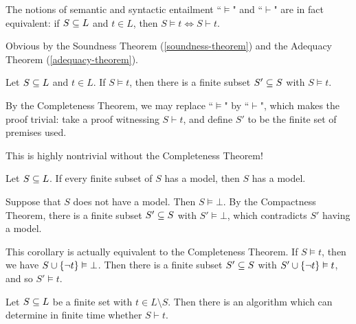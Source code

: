 \documentclass{article}
\begin{document}
\begin{theorem}
	\label{completeness-theorem}
    The notions of semantic and syntactic entailment ``$\vDash$" and ``$\vdash$" are in fact equivalent: if $S \subseteq L$ and $t \in L$, then $S \vDash t \iff S \vdash t$.
\end{theorem}

\begin{prf}
    Obvious by the Soundness Theorem (\ref{soundness-theorem}) and the Adequacy Theorem (\ref{adequacy-theorem}).
\end{prf}

\begin{theorem}
    Let $S \subseteq L$ and $t \in L$. If $S \vDash t$, then there is a finite subset $S' \subseteq S$ with $S \vDash t$.
\end{theorem}

\begin{prf}
    By the Completeness Theorem, we may replace ``$\vDash$" by ``$\vdash$", which makes the proof trivial: take a proof witnessing $S \vdash t$, and define $S'$ to be the finite set of premises used.
\end{prf}

\begin{note}
	This is highly nontrivial without the Completeness Theorem!
\end{note}

\begin{corollary}
    Let $S \subseteq L$. If every finite subset of $S$ has a model, then $S$ has a model.
\end{corollary}

\begin{prf}
    Suppose that $S$ does not have a model. Then $S \vDash \bot$. By the Compactness Theorem, there is a finite subset $S' \subseteq S$ with $S' \vDash \bot$, which contradicts $S'$ having a model.
\end{prf}

\begin{note}
	This corollary is actually equivalent to the Completeness Theorem. If $S \vDash t$, then we have $S \cup \left\lbrace \lnot t \right\rbrace \vDash \bot$. Then there is a finite subset $S' \subseteq S$ with $S' \cup \left\lbrace \lnot t \right\rbrace \vDash t$, and so $S' \vDash t$.
\end{note}

\begin{theorem}
    Let $S \subseteq L$ be a finite set with $t \in L \setminus S$. Then there is an algorithm which can determine in finite time whether $S \vdash t$.
\end{theorem}
\end{document}
